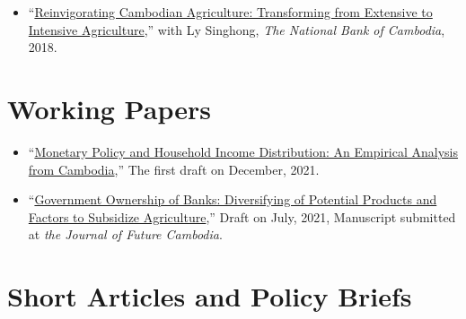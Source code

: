 \documentclass[10pt,a4paper]{article}
\begin{document}
		\begin{adjustwidth}{.7cm}{}
			\begin{itemize}[label={},itemindent=-2em,leftmargin=2em]
					
				\item “\href{https://ideas.repec.org/p/pra/mprapa/93086.html}{Reinvigorating Cambodian Agriculture: Transforming from Extensive to Intensive Agriculture},” with Ly Singhong, \textit{The National Bank of Cambodia}, 2018.	
			\end{itemize}
		\end{adjustwidth}
		\vspace{-1.5em}
\section*{Working Papers}
		\vspace{-0.5em}
		
	\begin{adjustwidth}{.7cm}{}
		\begin{itemize}[label={},itemindent=-2em,leftmargin=2em]
			\item “\href{https://nithkosal.github.io/research/papers/MPHI.pdf}{Monetary Policy and Household Income Distribution: An Empirical Analysis from Cambodia},” The first  draft on December, 2021.
			
			\item “\href{https://nithkosal.github.io/research/papers/GOB.pdf}{Government Ownership of Banks: Diversifying of Potential Products and Factors to Subsidize Agriculture},” Draft on July, 2021, Manuscript submitted at \textit{the Journal of Future Cambodia}.
			\end{itemize}
		\end{adjustwidth}
		\vspace{-1.5em}
\section*{Short Articles and Policy Briefs}	
\vspace{-0.5em}
\end{document}
